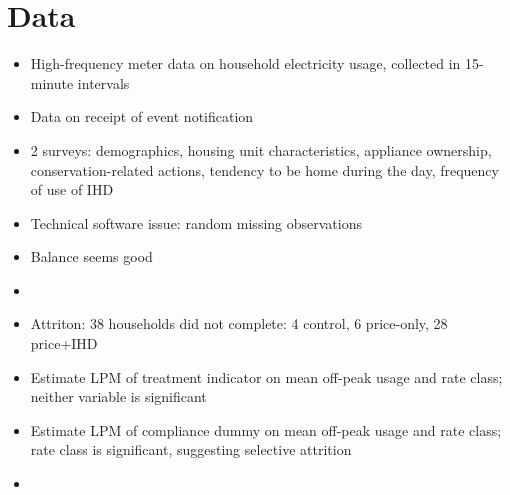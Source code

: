 \documentclass[12pt]{article}
\begin{document}
\section{Data}
\begin{itemize}
    \item High-frequency meter data on household electricity usage, collected in 15-minute intervals
    \item Data on receipt of event notification
    \item 2 surveys: demographics, housing unit characteristics, appliance ownership, conservation-related actions, tendency to be home during the day, frequency of use of IHD
    \item Technical software issue: random missing observations
    \item Balance seems good
    \item {}
    \item Attriton: 38 households did not complete: 4 control, 6 price-only, 28 price+IHD
    \item Estimate LPM of treatment indicator on mean off-peak usage and rate class; neither variable is significant
    \item Estimate LPM of compliance dummy on mean off-peak usage and rate class; rate class is significant, suggesting selective attrition
    \item {}
\end{itemize}
\end{document}
